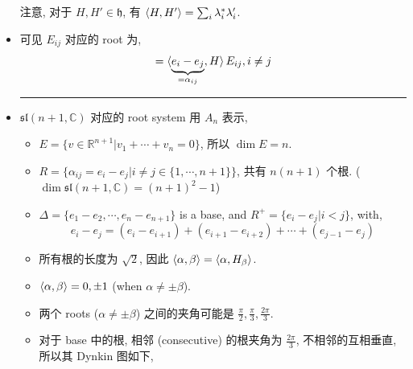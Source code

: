 \begin{itemize}
	注意, 对于 $H, H' \in \mathfrak{h}$, 有 $\braket{H, H'} = \sum_i \lambda_i^* \lambda'_i$.
	
	\item 可见 $E_{i j}$ 对应的 root 为,
	\begin{equation}
		[H, E_{i j}] = \braket{\underbrace{e_i - e_j}_{= \alpha_{i j}}, H} E_{i j}, i \neq j
	\end{equation}
	
	\noindent\rule[0.5ex]{\linewidth}{0.5pt} %
	
	\item $\mathfrak{sl}(n + 1, \mathbb{C})$ 对应的 root system 用 $A_n$ 表示,
	\begin{itemize}
		\item $E = \{v \in \mathbb{R}^{n + 1} | v_1 + \cdots + v_n = 0\}$, 所以 $\dim E = n$.
		
		\item $R = \{\alpha_{i j} = e_i - e_j | i \neq j \in \{1, \cdots, n + 1\}\}$, 共有 $n (n + 1)$ 个根. ($\dim \mathfrak{sl}(n + 1, \mathbb{C}) = (n + 1)^2 - 1$)
		
		\item $\Delta = \{e_1 - e_2, \cdots, e_n - e_{n + 1}\}$ is a base, and $R^+ = \{e_i - e_j | i < j\}$, with,
		\begin{equation}
			e_i - e_j = (e_i - e_{i + 1}) + (e_{i + 1} - e_{i + 2}) + \cdots + (e_{j - 1} - e_j)
		\end{equation}
		
		\item 所有根的长度为 $\sqrt{2}$, 因此 $\braket{\alpha, \beta} = \braket{\alpha, H_\beta}$.
		
		\item $\braket{\alpha, \beta} = 0, \pm 1$ (when $\alpha \neq \pm \beta$).
		
		\item 两个 roots ($\alpha \neq \pm \beta$) 之间的夹角可能是 $\frac{\pi}{2}, \frac{\pi}{3}, \frac{2 \pi}{3}$.
		
		\item 对于 base 中的根, 相邻 (consecutive) 的根夹角为 $\frac{2 \pi}{3}$, 不相邻的互相垂直, 所以其 Dynkin 图如下,
		

\end{itemize}
\end{itemize}

